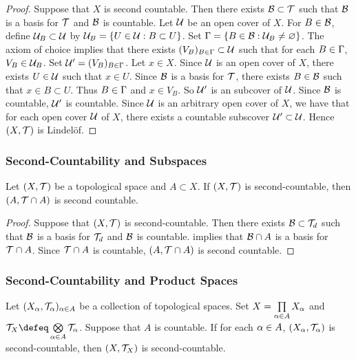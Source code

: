 \documentclass{book}
\begin{document}
	\begin{proof}
		Suppose that $X$ is second countable. Then there exists $\mathcal{B} \subset \mathcal{T}$ such that $\mathcal{B}$ is a basis for $\mathcal{T}$ and $\mathcal{B}$ is countable. Let $\mathcal{U}$ be an open cover of $X$. For $B \in \mathcal{B}$, define $\mathcal{U}_{B} \subset \mathcal{U}$ by 
		$\mathcal{U}_{B} = \{U \in \mathcal{U}: B \subset U\}$. Set $\Gamma = \{B \in \mathcal{B}: \mathcal{U}_B \neq \varnothing\}$. The axiom of choice implies that there exists $(V_B)_{B \in \Gamma} \subset \mathcal{U}$ such that for each $B \in \Gamma$, $V_B \in \mathcal{U}_B$. Set $\mathcal{U}' = (V_B)_{B \in \Gamma}$. Let $x \in X$. Since $\mathcal{U}$ is an open cover of $X$, there exists $U \in \mathcal{U}$ such that $x \in U$. Since $\mathcal{B}$ is a basis for $\mathcal{T}$, there exists $B \in \mathcal{B}$ such that $x \in B \subset U$. Thus $B \in \Gamma$ and $x \in V_B$. So $\mathcal{U}'$ is an subcover of $\mathcal{U}$. Since $\mathcal{B}$ is countable, $\mathcal{U}'$ is countable. Since $\mathcal{U}$ is an arbitrary open cover of $X$, we have that for each open cover $\mathcal{U}$ of $X$, there exists a countable subscover $\mathcal{U}' \subset \mathcal{U}$. Hence $(X, \mathcal{T})$ is Lindel\"{o}f.
	\end{proof}

	\subsubsection{Second-Countability and Subspaces}
	
	\begin{ex} 
			Let $(X, \mathcal{T})$ be a topological space and $A \subset X$. If $(X, \mathcal{T})$ is second-countable, then $(A, \mathcal{T} \cap A)$ is second countable.
	\end{ex}

	\begin{proof}
		Suppose that $(X, \mathcal{T})$ is second-countable. Then there exists $\mathcal{B} \subset \mathcal{T}_d$ such that $\mathcal{B}$ is a basis for $\mathcal{T}_d$ and $\mathcal{B}$ is countable.  implies that $\mathcal{B} \cap A$ is a basis for $\mathcal{T} \cap A$. Since $\mathcal{T} \cap A$ is countable, $(A, \mathcal{T} \cap A)$ is second countable. 
	\end{proof}
	
	

	\subsubsection{Second-Countability and Product Spaces}
	
	\begin{ex} 
		Let $(X_{\alpha}, \mathcal{T}_{\alpha})_{\alpha \in A}$ be a collection of topological spaces. Set $X = \prod\limits_{\alpha \in A} X_{\alpha}$ and $\MT_X \defeq \bigotimes\limits_{\al \in A} \MT_{\al}$. Suppose that $A$ is countable. If for each $\alpha \in A$, $(X_{\alpha}, \mathcal{T}_{\alpha})$ is second-countable, then $(X, \mathcal{T}_X)$ is second-countable. 
	\end{ex}
\end{document}
